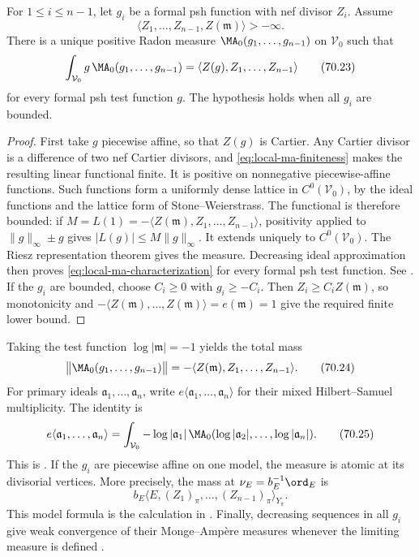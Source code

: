\begin{theorem}\label{thm:local-formal-ma}
For $1\leq i\leq n-1$, let $g_i$ be a formal psh function with nef
divisor $Z_i$.  Assume
\[
        \langle Z_1,\ldots,Z_{n-1},Z(\mathfrak m)\rangle> -\infty.
\tag{70.22}\label{eq:local-ma-finiteness}
\]
There is a unique positive Radon measure
$\MA_0(g_1,\ldots,g_{n-1})$ on $\mathcal V_0$ such that
\[
 \int_{\mathcal V_0}g\,
       \MA_0(g_1,\ldots,g_{n-1})
   =\langle Z(g),Z_1,\ldots,Z_{n-1}\rangle
\tag{70.23}\label{eq:local-ma-characterization}
\]
for every formal psh test function $g$.  The hypothesis holds when all
$g_i$ are bounded.
\end{theorem}

\begin{proof}
First take $g$ piecewise affine, so that $Z(g)$ is Cartier.  Any Cartier
divisor is a difference of two nef Cartier divisors, and
\eqref{eq:local-ma-finiteness} makes the resulting linear functional finite.
It is positive on nonnegative piecewise-affine functions.  Such functions
form a uniformly dense lattice in $C^0(\mathcal V_0)$, by the ideal
functions and the lattice form of Stone--Weierstrass.  The functional is
therefore bounded: if $M=L(1)=-\langle
Z(\mathfrak m),Z_1,\ldots,Z_{n-1}\rangle$, positivity applied to
$\|g\|_\infty\pm g$ gives $|L(g)|\leq M\|g\|_\infty$.
It extends uniquely to $C^0(\mathcal V_0)$.  The Riesz representation theorem gives the
measure.  Decreasing ideal approximation then proves
\eqref{eq:local-ma-characterization} for every formal psh test function.  See
\cite[Proposition~4.6]{BFJ08}.
If the $g_i$ are bounded, choose $C_i\geq0$ with
$g_i\geq-C_i$.  Then $Z_i\geq C_iZ(\mathfrak m)$, so monotonicity and
$-\langle Z(\mathfrak m),\ldots,Z(\mathfrak m)\rangle
=e(\mathfrak m)=1$ give the required finite lower bound.
\end{proof}

Taking the test function $\log|\mathfrak m|=-1$ yields the total mass
\[
 \bigl\|\MA_0(g_1,\ldots,g_{n-1})\bigr\|
 =-\langle Z(\mathfrak m),Z_1,\ldots,Z_{n-1}\rangle.
\tag{70.24}\label{eq:local-ma-total-mass}
\]
For primary ideals $\mathfrak a_1,\ldots,\mathfrak a_n$, write
$e\langle\mathfrak a_1,\ldots,\mathfrak a_n\rangle$ for their mixed
Hilbert--Samuel multiplicity.  The identity is
\[
 e\langle\mathfrak a_1,\ldots,\mathfrak a_n\rangle
 =\int_{\mathcal V_0}-\log|\mathfrak a_1|\,
   \MA_0(\log|\mathfrak a_2|,\ldots,
                 \log|\mathfrak a_n|).
\tag{70.25}\label{eq:local-mixed-multiplicity}
\]
This is \cite[Proposition~4.7]{BFJ08}.
If the $g_i$ are piecewise affine on one model, the measure is atomic at
its divisorial vertices.  More precisely, the mass at
$\nu_E=b_E^{-1}\ord_E$ is
\[
 b_E\bigl\langle E,(Z_1)_\pi,\ldots,(Z_{n-1})_\pi
             \bigr\rangle_{Y_\pi}.
\tag{70.26}\label{eq:local-atomic-ma}
\]
This model formula is the calculation in
\cite[Proposition~4.9]{BFJ08}.
Finally, decreasing sequences in all $g_i$ give weak convergence of
their Monge--Amp\`ere measures whenever the limiting measure is defined
\cite[Proposition~4.8]{BFJ08}.

